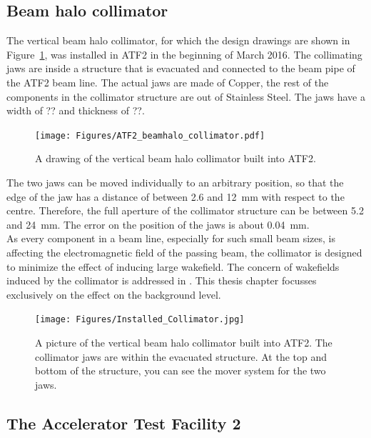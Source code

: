 \subsection{Beam halo collimator}
\label{Collimator}

The vertical beam halo collimator, for which the design drawings are shown in Figure~\ref{fig:collimator}, was installed in ATF2 in the beginning of March 2016. The collimating jaws are inside a structure that is evacuated and connected to the beam pipe of the ATF2 beam line. The actual jaws are made of Copper, the rest of the components in the collimator structure are out of Stainless Steel. The jaws have a width of ?? and thickness of ??.

\begin{figure}
\centering
\texttt{[image: Figures/ATF2\_beamhalo\_collimator.pdf]}
\caption[Drawing of the beam halo collimator]{A drawing of the vertical beam halo collimator built into ATF2.\cite{NuriaCollimator2015}}
\label{fig:collimator}
\end{figure}

The two jaws can be moved individually to an arbitrary position, so that the edge of the jaw has a distance of between 2.6 and \SI{12}{\milli\metre} with respect to the centre. Therefore, the full aperture of the collimator structure can be between 5.2 and \SI{24}{\milli\metre}. The error on the position of the jaws is about \SI{0.04}{\milli\metre}.\\
As every component in a beam line, especially for such small beam sizes, is affecting the electromagnetic field of the passing beam, the collimator is designed to minimize the effect of inducing large wakefield. The concern of wakefields induced by the collimator is addressed in \cite{NuriaCollimator2015}. This thesis chapter focusses exclusively on the effect on the background level.

\begin{figure}
\centering
\texttt{[image: Figures/Installed\_Collimator.jpg]}
\caption[Picture of the installed beam halo collimator]{A picture of the vertical beam halo collimator built into ATF2. The collimator jaws are within the evacuated structure. At the top and bottom of the structure, you can see the mover system for the two jaws.}
\label{fig:installed_collimator}
\end{figure}

\subsection{The Accelerator Test Facility 2}
\label{ATF2}

